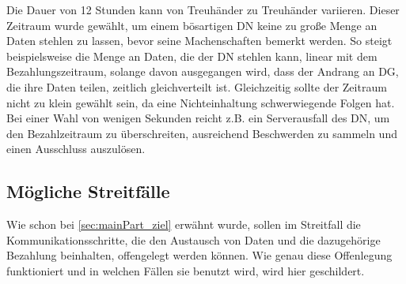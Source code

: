 \documentclass[
	fontsize=11pt,
	headings=small,
	parskip=half,           %
	bibliography=totoc,
	numbers=noenddot,       %
	open=any,               %
]{scrreprt}
\begin{document}
Die Dauer von 12 Stunden kann von Treuhänder zu Treuhänder variieren. Dieser Zeitraum wurde gewählt, um einem bösartigen DN keine zu große Menge an Daten stehlen zu lassen, bevor seine Machenschaften bemerkt werden. So steigt beispielsweise die Menge an Daten, die der DN stehlen kann, linear mit dem Bezahlungszeitraum, solange davon ausgegangen wird, dass der Andrang an DG, die ihre Daten teilen, zeitlich gleichverteilt ist. Gleichzeitig sollte der Zeitraum nicht zu klein gewählt sein, da eine Nichteinhaltung schwerwiegende Folgen hat. Bei einer Wahl von wenigen Sekunden reicht z.B. ein Serverausfall des DN, um den Bezahlzeitraum zu überschreiten, ausreichend Beschwerden zu sammeln und einen Ausschluss auszulösen.

\subsection{Mögliche Streitfälle}
\label{subsec:payStreit}
Wie schon bei \ref{sec:mainPart_ziel} erwähnt wurde, sollen im Streitfall die Kommunikationsschritte, die den Austausch von Daten und die dazugehörige Bezahlung beinhalten, offengelegt werden können. Wie genau diese Offenlegung funktioniert und in welchen Fällen sie benutzt wird, wird hier geschildert.\\
\end{document}
